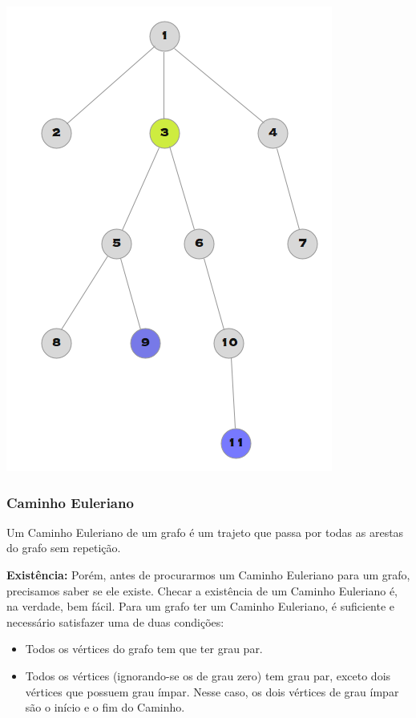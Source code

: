 \documentclass[a4paper,12pt]{article}
\begin{document}
\begin{center}
  \includegraphics[width=\linewidth/2]{figures/grafos/LCA.png}
\end{center}


\subsubsection{Caminho Euleriano}

Um Caminho Euleriano de um grafo é um trajeto que passa por todas as arestas do grafo sem repetição.

\noindent\textbf{Existência:} Porém, antes de procurarmos um Caminho Euleriano para um grafo, precisamos saber se ele existe. Checar a existência de um Caminho Euleriano é, na verdade, bem fácil. Para um grafo ter um Caminho Euleriano, é suficiente e necessário satisfazer uma de duas condições:
\begin{itemize}
    \item Todos os vértices do grafo tem que ter grau par.
    \item Todos os vértices (ignorando-se os de grau zero) tem grau par, exceto dois vértices que possuem grau ímpar. Nesse caso, os dois vértices de grau ímpar são o início e o fim do Caminho.
\end{itemize}
\end{document}
